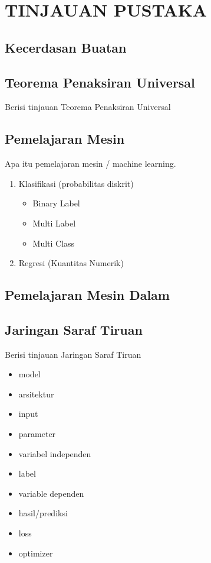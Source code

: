 

\chapter{TINJAUAN PUSTAKA}
\label{cha:2-TinjauanPustaka}

\section{Kecerdasan Buatan \label{sec:2-KecerdasanBuatan}}

\section{Teorema Penaksiran Universal \label{sec:2-TeoremaPenaksiranUniversal}}
Berisi tinjauan Teorema Penaksiran Universal~\cite{fastbook} \cite{8765346}

\section{Pemelajaran Mesin\label{sec:2-PemelajaranMesin}}
Apa itu pemelajaran mesin / machine learning.
\begin{enumerate}
  \item Klasifikasi (probabilitas diskrit)
  \begin{itemize}
    \item Binary Label
    \item Multi Label
    \item Multi Class
  \end{itemize}
  \item Regresi (Kuantitas Numerik)
\end{enumerate}

\section{Pemelajaran Mesin Dalam\label{sec:2-PemelajaranMesinDalam}}

\section{Jaringan Saraf Tiruan \label{sec:2-JaringanSarafTiruan}}
Berisi tinjauan Jaringan Saraf Tiruan

\begin{itemize}
  \item model
  \item arsitektur
  \item input
  \item parameter
  \item variabel independen
  \item label
  \item variable dependen
  \item hasil/prediksi
  \item loss
  \item optimizer
\end{itemize}

